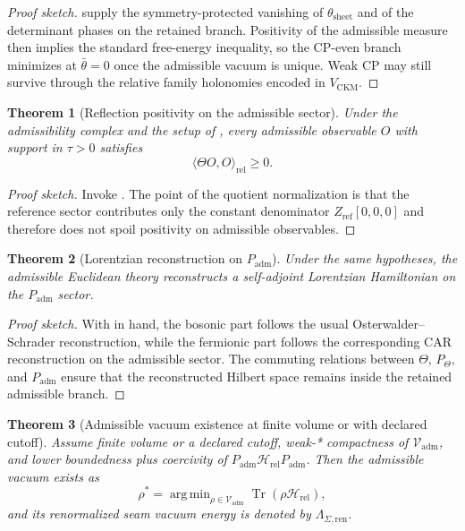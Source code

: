 \documentclass[11pt,a4paper]{article}
\newtheorem{theorem}{Theorem}[section]
\theoremstyle{definition}
\theoremstyle{remark}
\DeclareMathOperator{\tr}{Tr}
\DeclareMathOperator{\argmin}{arg\,min}
\newcommand{\Seam}{\Sigma}
\newcommand{\Vadm}{\mathcal V_{\mathrm{adm}}}
\newcommand{\Hrel}{\mathcal H_{\mathrm{rel}}}
\newcommand{\Padm}{P_{\mathrm{adm}}}
\begin{document}
\begin{proof}[Proof sketch]
 supply the symmetry-protected vanishing of $\theta_{\mathrm{sheet}}$ and of the determinant phases on the retained branch. Positivity of the admissible measure then implies the standard free-energy inequality, so the CP-even branch minimizes at $\bar\theta=0$ once the admissible vacuum is unique. Weak CP may still survive through the relative family holonomies encoded in $V_{\mathrm{CKM}}$.
\end{proof}

\begin{theorem}[Reflection positivity on the admissible sector]
\label{thm:reflection-positivity-admissible}
Under the admissibility complex and the setup of , every admissible observable $O$ with support in $\tau>0$ satisfies
\[
\langle \Theta O,O\rangle_{\mathrm{rel}}\ge 0.
\]
\end{theorem}

\begin{proof}[Proof sketch]
Invoke . The point of the quotient normalization is that the reference sector contributes only the constant denominator $Z_{\mathrm{ref}}[0,0,0]$ and therefore does not spoil positivity on admissible observables.
\end{proof}

\begin{theorem}[Lorentzian reconstruction on \texorpdfstring{$\Padm$}{Padm}]
\label{thm:lorentzian-reconstruction}
Under the same hypotheses, the admissible Euclidean theory reconstructs a self-adjoint Lorentzian Hamiltonian on the $\Padm$ sector.
\end{theorem}

\begin{proof}[Proof sketch]
With  in hand, the bosonic part follows the usual Osterwalder--Schrader reconstruction, while the fermionic part follows the corresponding CAR reconstruction on the admissible sector. The commuting relations between $\Theta$, $P_\Theta$, and $\Padm$ ensure that the reconstructed Hilbert space remains inside the retained admissible branch.
\end{proof}

\begin{theorem}[Admissible vacuum existence at finite volume or with declared cutoff]
\label{thm:admissible-vacuum-existence}
Assume finite volume or a declared cutoff, weak-* compactness of $\Vadm$, and
lower boundedness plus coercivity of $\Padm\Hrel\Padm$. Then the admissible
vacuum exists as
\[
\rho^\ast=\argmin_{\rho\in\Vadm}\tr(\rho\Hrel),
\]
and its renormalized seam vacuum energy is denoted by $\Lambda_{\Seam,\mathrm{ren}}$.
\end{theorem}
\end{document}
